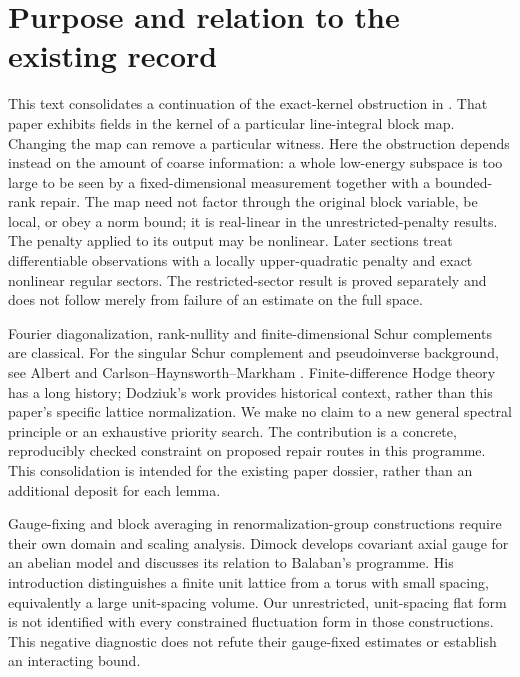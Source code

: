 \documentclass[11pt]{article}
\begin{document}
\section{Purpose and relation to the existing record}
This text consolidates a continuation of the exact-kernel obstruction in
\cite{eriksson}. That paper exhibits fields in the kernel of a particular
line-integral block map. Changing the map can remove a particular witness.
Here the obstruction depends instead on the amount of coarse information:
a whole low-energy subspace is too large to be seen by a fixed-dimensional
measurement together with a bounded-rank repair. The map need not factor
through the original block variable, be local, or obey a norm bound; it is
real-linear in the unrestricted-penalty results. The penalty applied to its output may be nonlinear. Later sections treat differentiable observations with a locally upper-quadratic penalty and exact nonlinear regular sectors.
The restricted-sector result is proved separately and does not follow merely
from failure of an estimate on the full space.

Fourier diagonalization, rank-nullity and finite-dimensional Schur complements
are classical. For the singular Schur complement and pseudoinverse background,
see Albert and Carlson--Haynsworth--Markham \cite{albert,carlson}. Finite-difference Hodge theory has a long history; Dodziuk's
work \cite{dodziuk} provides historical context, rather than this paper's
specific lattice normalization. We make no claim to a new general spectral
principle or an exhaustive priority search. The contribution is a concrete,
reproducibly checked constraint on proposed repair routes in this programme.
This consolidation is intended for the existing paper dossier, rather than
an additional deposit for each lemma.

Gauge-fixing and block averaging in renormalization-group constructions
require their own domain and scaling analysis. Dimock \cite{dimock} develops
covariant axial gauge for an abelian model and discusses its relation to
Balaban's programme. His introduction distinguishes a finite unit lattice
from a torus with small spacing, equivalently a large unit-spacing volume.
Our unrestricted, unit-spacing flat form is not identified with every
constrained fluctuation form in those constructions. This negative diagnostic
does not refute their gauge-fixed estimates or establish an interacting bound.
\end{document}
